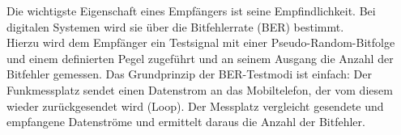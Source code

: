 %
Die wichtigste Eigenschaft eines Empfängers ist seine Empfindlichkeit. Bei digitalen Systemen wird sie über die Bitfehlerrate (BER) bestimmt.\\ Hierzu wird dem Empfänger ein Testsignal mit einer Pseudo-Random-Bitfolge und einem definierten Pegel zugeführt und an seinem Ausgang die Anzahl der Bitfehler gemessen. Das Grundprinzip der BER-Testmodi ist einfach: Der Funkmessplatz sendet einen Datenstrom an das Mobiltelefon, der vom diesem wieder zurückgesendet wird (Loop). Der Messplatz vergleicht gesendete und empfangene Datenströme und ermittelt daraus die Anzahl der Bitfehler. \cite{BitfehlerratenMessungAnGsmMobiltelefonen}\\
